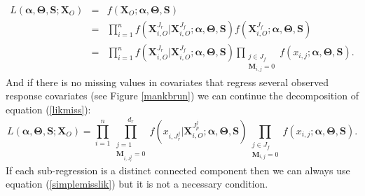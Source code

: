\documentclass[12pt,a4paper]{report}
\begin{document}

\begin{eqnarray}
	L(\boldsymbol{\alpha},\boldsymbol{\Theta},\boldsymbol{S};\boldsymbol{X}_O)&=& 
	f(\boldsymbol{X}_{O};\boldsymbol{\alpha},\boldsymbol{\Theta},\boldsymbol{S}) \nonumber \\
&=&	\prod_{i=1}^nf(\boldsymbol{X}^{J_r}_{i,O}|\boldsymbol{X}^{J_f}_{i,O};\boldsymbol{\alpha},\boldsymbol{\Theta},\boldsymbol{S})f(\boldsymbol{X}^{J_f}_{i,O};\boldsymbol{\alpha},\boldsymbol{\Theta},\boldsymbol{S})\quad   \nonumber \\
	&=&\prod_{i=1}^nf(\boldsymbol{X}^{J_r}_{i,O}|\boldsymbol{X}^{J_f}_{i,O};\boldsymbol{\alpha},\boldsymbol{\Theta},\boldsymbol{S})\prod_{\substack{j \in J_f \\ \boldsymbol{M}_{i,j}=0}}f(x_{i,j};\boldsymbol{\alpha},\boldsymbol{\Theta},\boldsymbol{S}).\label{likmiss}
\end{eqnarray}
And if there is no missing values in covariates that regress several observed response covariates (see Figure \ref{mankbrun}) we can continue the decomposition of equation (\ref{likmiss}):
	\begin{equation}
		L(\boldsymbol{\alpha},\boldsymbol{\Theta},\boldsymbol{S};\boldsymbol{X}_O)=\prod_{i=1}^n\prod_{\substack{j =1 \\ \boldsymbol{M}_{i,J_r^j}=0}}^{d_r}f(x_{i,J_r^j}|\boldsymbol{X}^{J_p^j}_{i,O};\boldsymbol{\alpha},\boldsymbol{\Theta},\boldsymbol{S})\prod_{\substack{j \in J_f \\ \boldsymbol{M}_{i,j}=0}}f(x_{i,j};\boldsymbol{\alpha},\boldsymbol{\Theta},\boldsymbol{S}). \label{simplemisslik}
\end{equation}	
If each sub-regression is a distinct connected component then we can always use equation (\ref{simplemisslik}) but it is not a necessary condition. \\
\end{document}
